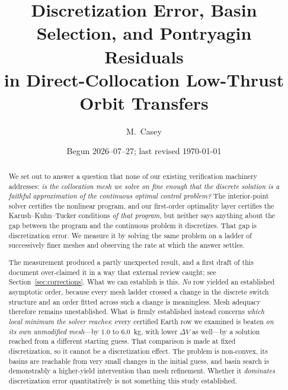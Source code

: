 \documentclass[11pt]{article}
\title{Discretization Error, Basin Selection, and Pontryagin Residuals\\
       in Direct-Collocation Low-Thrust Orbit Transfers}
\author{M.\ Casey}
\date{Begun 2026--07--27; last revised \today}
\begin{document}
\maketitle

\begin{abstract}
We set out to answer a question that none of our existing verification
machinery addresses: \emph{is the collocation mesh we solve on fine enough
that the discrete solution is a faithful approximation of the continuous
optimal control problem?} The interior-point solver certifies the nonlinear
program, and our first-order optimality layer certifies the Karush--Kuhn--Tucker
conditions \emph{of that program}, but neither says anything about the gap
between the program and the continuous problem it discretizes. That gap is
discretization error. We measure it by solving the same problem on a ladder of
successively finer meshes and observing the rate at which the answer settles.

The measurement produced a partly unexpected result, and a first draft of this
document over-claimed it in a way that external review caught; see
Section~\ref{sec:corrections}. What we can establish is this. \emph{No} row
yielded an established asymptotic order, because every mesh ladder crossed a
change in the discrete switch structure and an order fitted across such a
change is meaningless. Mesh adequacy therefore remains unestablished. What is
firmly established instead concerns \emph{which local minimum the solver
reaches}: every certified Earth row we examined is beaten \emph{on its own
unmodified mesh}---by $1.0$ to $6.0$~kg, with lower $\Delta V$ as well---by a
solution reached from a different starting guess. That comparison is made at
fixed discretization, so it cannot be a discretization effect. The problem is
non-convex, its basins are reachable from very small changes in the initial
guess, and basin search is demonstrably a higher-yield intervention than mesh
refinement. Whether it \emph{dominates} discretization error quantitatively is
not something this study established.


\end{abstract}
\end{document}
